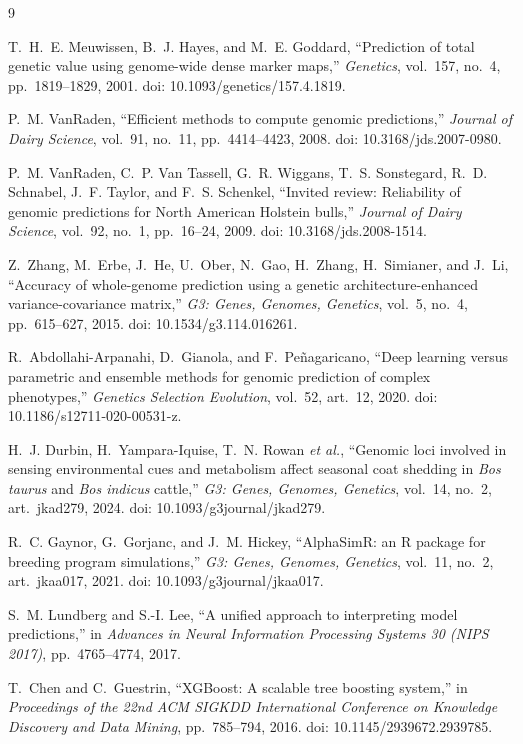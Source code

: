 \documentclass[conference]{IEEEtran}
\begin{document}
\begin{thebibliography}{9}

T.~H.~E. Meuwissen, B.~J. Hayes, and M.~E. Goddard,
``Prediction of total genetic value using genome-wide dense marker maps,''
\emph{Genetics}, vol.~157, no.~4, pp.~1819--1829, 2001.
doi: 10.1093/genetics/157.4.1819.

P.~M. VanRaden,
``Efficient methods to compute genomic predictions,''
\emph{Journal of Dairy Science}, vol.~91, no.~11, pp.~4414--4423, 2008.
doi: 10.3168/jds.2007-0980.

P.~M. VanRaden, C.~P. Van Tassell, G.~R. Wiggans, T.~S. Sonstegard,
R.~D. Schnabel, J.~F. Taylor, and F.~S. Schenkel,
``Invited review: Reliability of genomic predictions for North American
Holstein bulls,''
\emph{Journal of Dairy Science}, vol.~92, no.~1, pp.~16--24, 2009.
doi: 10.3168/jds.2008-1514.

Z.~Zhang, M.~Erbe, J.~He, U.~Ober, N.~Gao, H.~Zhang, H.~Simianer, and
J.~Li,
``Accuracy of whole-genome prediction using a genetic
architecture-enhanced variance-covariance matrix,''
\emph{G3: Genes, Genomes, Genetics}, vol.~5, no.~4, pp.~615--627, 2015.
doi: 10.1534/g3.114.016261.

R.~Abdollahi-Arpanahi, D.~Gianola, and F.~Peñagaricano,
``Deep learning versus parametric and ensemble methods for genomic
prediction of complex phenotypes,''
\emph{Genetics Selection Evolution}, vol.~52, art.~12, 2020.
doi: 10.1186/s12711-020-00531-z.

H.~J. Durbin, H.~Yampara-Iquise, T.~N. Rowan \emph{et al.},
``Genomic loci involved in sensing environmental cues and metabolism
affect seasonal coat shedding in \emph{Bos taurus} and \emph{Bos indicus}
cattle,''
\emph{G3: Genes, Genomes, Genetics}, vol.~14, no.~2, art.~jkad279, 2024.
doi: 10.1093/g3journal/jkad279.

R.~C. Gaynor, G.~Gorjanc, and J.~M. Hickey,
``AlphaSimR: an R package for breeding program simulations,''
\emph{G3: Genes, Genomes, Genetics}, vol.~11, no.~2, art.~jkaa017, 2021.
doi: 10.1093/g3journal/jkaa017.

S.~M. Lundberg and S.-I. Lee,
``A unified approach to interpreting model predictions,''
in \emph{Advances in Neural Information Processing Systems 30
(NIPS 2017)}, pp.~4765--4774, 2017.

T.~Chen and C.~Guestrin,
``XGBoost: A scalable tree boosting system,''
in \emph{Proceedings of the 22nd ACM SIGKDD International Conference on
Knowledge Discovery and Data Mining}, pp.~785--794, 2016.
doi: 10.1145/2939672.2939785.

\end{thebibliography}
\end{document}
